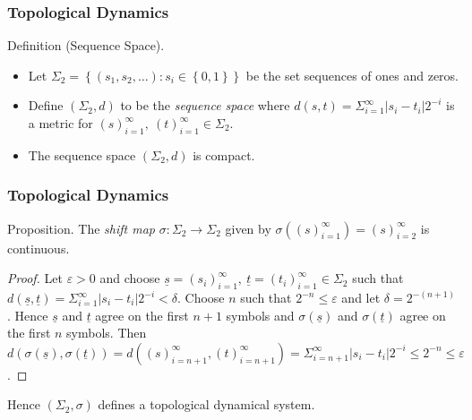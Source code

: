 \documentclass{beamer}
\begin{document}
\begin{frame}
    \frametitle{Topological Dynamics}
    \begin{block}{Definition (Sequence Space).}
        \begin{itemize}
            \item Let $\Sigma_2 = \left\lbrace (s_1, s_2, \dots): s_i \in \left\lbrace 0, 1 \right\rbrace \right\rbrace$ be the set sequences of ones and zeros.
            \item Define $(\Sigma_2, d)$ to be the \emph{sequence space} where $d(s, t) = \Sigma_{i=1}^{\infty}|s_i - t_i|2^{-i}$ is a metric for $(s)_{i=1}^{\infty}, \ (t)_{i=1}^{\infty}  \in \Sigma_2$.
            \item The sequence space $(\Sigma_2, d)$ is compact.
        \end{itemize}
    \end{block}
\end{frame}

\begin{frame}
    \frametitle{Topological Dynamics}
    \begin{block}{Proposition.}
        The \emph{shift map} $\sigma: \Sigma_2 \to \Sigma_2$ given by $\sigma \left((s)_{i=1}^{\infty}\right) = (s)_{i=2}^{\infty}$ is continuous.
        \begin{proof}
            Let $\varepsilon > 0$ and choose $\underline{s} = (s_i)_{i=1}^{\infty}, \ \underline{t} = (t_i)_{i=1}^{\infty} \in \Sigma_2$ such that $d(\underline{s}, \underline{t}) = \Sigma_{i=1}^{\infty}|s_i - t_i|2^{-i} < \delta$. Choose $n$ such that $2^{-n} \leq \varepsilon$ and let $\delta = 2^{-(n+1)}$. Hence $\underline{s}$ and $\underline{t}$ agree on the first $n+1$ symbols and $\sigma\left(\underline{s}\right)$ and $\sigma\left(\underline{t}\right)$ agree on the first $n$ symbols. Then $d\left( \sigma\left(\underline{s}\right), \sigma\left(\underline{t}\right) \right) = d\left((s)_{i=n+1}^{\infty}, (t)_{i=n+1}^{\infty}\right) = \Sigma_{i=n+1}^{\infty}|s_i - t_i|2^{-i} \leq 2^{-n} \leq \varepsilon$.
        \end{proof}
    \end{block}
    \vspace{0.5cm}
    Hence $(\Sigma_2, \sigma)$ defines a topological dynamical system.
\end{frame}
\end{document}
